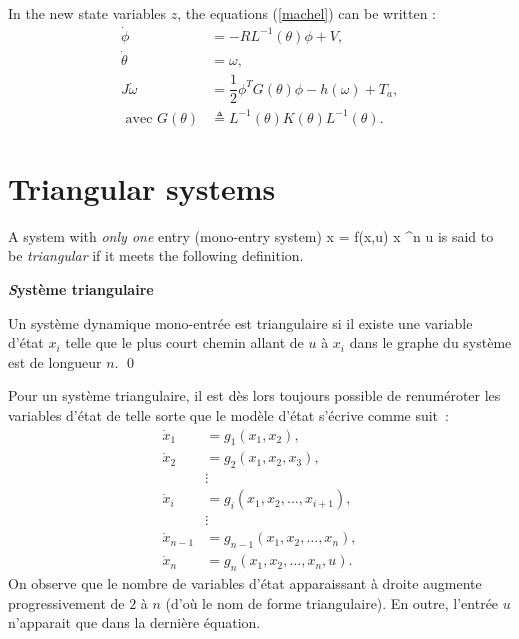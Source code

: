 In the new state variables $z$, the equations (\ref{machel}) can be written : 
\begin{equation*} \begin{split}
\dot\phi &= -RL^{-1}(\theta)\phi+ V,\\
\dot \theta &= \omega,\\
J\dot\omega &= \dfrac{1}{2} \phi^T G(\theta) \phi - h(\omega) + T_a,\\
\mbox{ avec } G(\theta) &\triangleq  L^{-1}(\theta)K(\theta)L^{-1}(\theta).
\end{split} \end{equation*}
\vv

\section{Triangular systems} \label{triangulaire}
 
 A system with {\it only one} entry (mono-entry system)
 \eqn
 \dot x = f(x,u) \hh \hh x \in \real^n \hh \hh u \in \real \label{mono}
 \eeqn
is said to be {\it triangular} if it meets the following definition.

\begin{definition}{\bf \emph Système triangulaire}

Un système dynamique mono-entrée est triangulaire si il existe une variable d'état $x_i$ telle que le plus court chemin allant de $u$ à $x_i$ dans le graphe du système est de longueur $n$. \qed
\end{definition}

Pour un système triangulaire, il est dès lors toujours possible de renuméroter les variables d'état de telle sorte que le modèle d'état s'écrive comme suit~:
\begin{equation} \begin{split} \label{systriang}
\dot x_1 &= g_1(x_1,x_2),  \\
\dot x_2 &= g_2(x_1,x_2, x_3),  \\
&\vdots  \\
\dot x_i &= g_i(x_1,x_2, \dots ,x_{i+1}),  \\
&\vdots  \\
\dot x_{n-1} &= g_{n-1}(x_1,x_2, \dots ,x_n),  \\
\dot x_n &= g_n(x_1,x_2, \dots ,x_n,u).  
\end{split} \end{equation}
On observe que le nombre de variables d'état apparaissant à droite augmente progressivement de $2$ à $n$ (d'où le nom de forme triangulaire). En outre, l'entrée $u$ n'apparait que dans la dernière équation.
\vv

